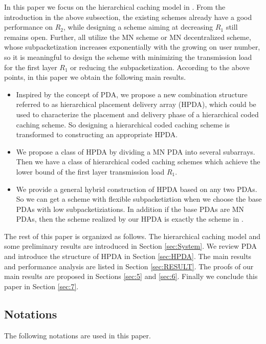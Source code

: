 \documentclass[onecolumn,10pt]{IEEEtran}
\theoremstyle{mythm}
\begin{document}
In this paper we focus on the hierarchical caching model in \cite{KNMD}. From the introduction in the above subsection, the existing schemes already have a good performance on $R_2$, while designing a scheme aiming at decreasing $R_1$ still remains open. Further, \cite{KNMD,ZWXWL,WWCY} all utilize the MN scheme or MN decentralized scheme, whose subpacketization increases exponentially with the growing on user number, so it is meaningful to design the scheme with minimizing the transmission load for the first layer $R_1$ or reducing the subpacketization. According to the above points, in this paper we obtain the following main results.
\begin{itemize}
\item   Inspired by the concept of PDA, we propose a new combination structure referred to as hierarchical placement delivery array (HPDA), which could be used to characterize the placement and delivery phase of a hierarchical coded caching scheme. So designing a hierarchical coded caching scheme is transformed to constructing an appropriate HPDA.
\item We propose a class of HPDA by dividing a MN PDA into several subarrays. Then we have a class of hierarchical coded caching schemes which achieve the lower bound of the first layer transmission load $R_1$.
\item We provide a general hybrid construction of HPDA based on any two PDAs. So we can get a scheme with flexible subpacketiztion when we choose the base PDAs with low subpacketiziations. In addition if the base PDAs are MN PDAs, then the scheme realized by our HPDA is exactly the scheme in \cite{WWCY}.
\end{itemize}
The rest of this paper is organized as follows. The hierarchical caching model and some preliminary results are introduced in Section \ref{sec:System}. We review PDA and introduce the structure of HPDA in Section \ref{sec:HPDA}. The main results and performance analysis are listed in Section \ref{sec:RESULT}. The proofs of our main results are proposed in Sections \ref{sec:5} and \ref{sec:6}. Finally we conclude this paper in Section \ref{sec:7}.

\subsection{Notations}
 The following notations are used in this paper.
\end{document}
